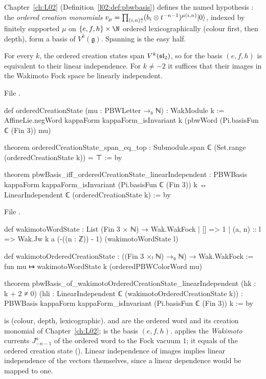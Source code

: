 Chapter~\ref{ch:L02} (Definition~\ref{l02:def:pbwbasis}) defines the named hypothesis
: the \emph{ordered creation monomials}
$v_\mu = \prod_{(i,n)\uparrow}(b_i\otimes t^{-n-1})^{\mu(i,n)}|0\rangle$, indexed by finitely supported
$\mu$ on $\{e,f,h\}\times\N$ ordered lexicographically (colour first, then depth), form a basis of
$V^k(\mathfrak g)$. Spanning is the easy half.

\begin{proposition}\label{l08:prop:pbwreduce}
For every $k$, the ordered creation states span $V^k(\mathfrak{sl}_2)$, so  for the basis
$(e,f,h)$ is equivalent to their linear independence. For $k\ne-2$ it suffices that their images in
the Wakimoto Fock space be linearly independent.
\end{proposition}

\noindent File .
\begin{leancode}
def orderedCreationState (mu : PBWLetter →₀ ℕ) : WakModule k :=
  AffineLie.negWord kappaForm kappaForm_isInvariant k
    (pbwWord (Pi.basisFun ℂ (Fin 3)) mu)

theorem orderedCreationState_span_eq_top :
    Submodule.span ℂ (Set.range (orderedCreationState k)) = ⊤ := by

theorem pbwBasis_iff_orderedCreationState_linearIndependent :
    PBWBasis kappaForm kappaForm_isInvariant (Pi.basisFun ℂ (Fin 3)) k ↔
      LinearIndependent ℂ (orderedCreationState k) := by
\end{leancode}
\noindent File .
\begin{leancode}
def wakimotoWordState : List (Fin 3 × ℕ) → Wak.WakFock
  | [] => 1
  | (a, n) :: l => Wak.Jw k a (-((n : ℤ)) - 1) (wakimotoWordState l)

def wakimotoOrderedCreationState : ((Fin 3 ×ₗ ℕ) →₀ ℕ) → Wak.WakFock :=
  fun mu ↦ wakimotoWordState k (orderedPBWColorWord mu)

theorem pbwBasis_of_wakimotoOrderedCreationState_linearIndependent
    (hk : k + 2 ≠ 0)
    (hli : LinearIndependent ℂ (wakimotoOrderedCreationState k)) :
    PBWBasis kappaForm kappaForm_isInvariant (Pi.basisFun ℂ (Fin 3)) k := by
\end{leancode}

\begin{dictionary}
 is  (colour, depth, lexicographic).  and 
are the ordered word and its creation monomial of Chapter~\ref{ch:L02}; 
is the basis $(e,f,h)$.  applies the \emph{Wakimoto} currents
$J^a_{-n-1}$ of the ordered word to the Fock vacuum $1$; it equals  of the ordered
creation state (\allowbreak{}). Linear independence of images implies linear
independence of the vectors themselves, since a linear dependence would be mapped to one.
\end{dictionary}

